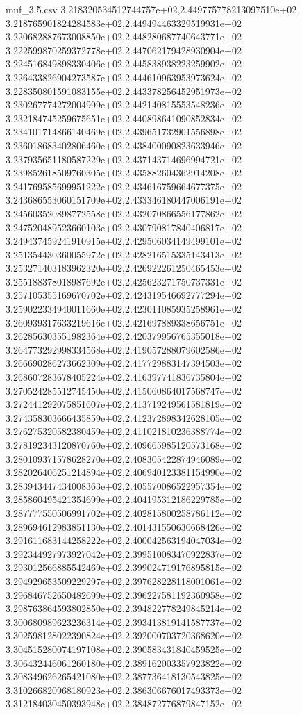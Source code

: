 \begin{filecontents*}{muf_3.5.csv}
3.218320534512744757e+02,2.449775778213097510e+02
3.218765901824284583e+02,2.449494463329519931e+02
3.220682887673008850e+02,2.448280687740643771e+02
3.222599870259372778e+02,2.447062179428930904e+02
3.224516849898330406e+02,2.445838938223259902e+02
3.226433826904273587e+02,2.444610963953973624e+02
3.228350801591083155e+02,2.443378256452951973e+02
3.230267774272004999e+02,2.442140815553548236e+02
3.232184745259675651e+02,2.440898641090852834e+02
3.234101714866140469e+02,2.439651732901556898e+02
3.236018683402806460e+02,2.438400090823633946e+02
3.237935651180587229e+02,2.437143714696994721e+02
3.239852618509760305e+02,2.435882604362914208e+02
3.241769585699951222e+02,2.434616759664677375e+02
3.243686553060151709e+02,2.433346180447006191e+02
3.245603520898772558e+02,2.432070866556177862e+02
3.247520489523660103e+02,2.430790817840406817e+02
3.249437459241910915e+02,2.429506034149499101e+02
3.251354430360055972e+02,2.428216515335143413e+02
3.253271403183962320e+02,2.426922261250465453e+02
3.255188378018987692e+02,2.425623271750737331e+02
3.257105355169670702e+02,2.424319546692777294e+02
3.259022334940011660e+02,2.423011085935258961e+02
3.260939317633219616e+02,2.421697889338656751e+02
3.262856303551982364e+02,2.420379956765355018e+02
3.264773292998334568e+02,2.419057288079602586e+02
3.266690286273662309e+02,2.417729883147394503e+02
3.268607283678405224e+02,2.416397741836735804e+02
3.270524285512745450e+02,2.415060864017568747e+02
3.272441292075851607e+02,2.413719249561581819e+02
3.274358303666435859e+02,2.412372898342628105e+02
3.276275320582380459e+02,2.411021810236388774e+02
3.278192343120870760e+02,2.409665985120573168e+02
3.280109371578628270e+02,2.408305422874946089e+02
3.282026406251214894e+02,2.406940123381154990e+02
3.283943447434008363e+02,2.405570086522957354e+02
3.285860495421354699e+02,2.404195312186229785e+02
3.287777550506991702e+02,2.402815800258786112e+02
3.289694612983851130e+02,2.401431550630668426e+02
3.291611683144258222e+02,2.400042563194047034e+02
3.292344927973927042e+02,2.399510083470922837e+02
3.293012566885542469e+02,2.399024719176895815e+02
3.294929653509229297e+02,2.397628228118001061e+02
3.296846752650482699e+02,2.396227581192360958e+02
3.298763864593802850e+02,2.394822778249845214e+02
3.300680989623236314e+02,2.393413819141587737e+02
3.302598128022390824e+02,2.392000703720368620e+02
3.304515280074197108e+02,2.390583431840459525e+02
3.306432446061260180e+02,2.389162003357923822e+02
3.308349626265421080e+02,2.387736418130543825e+02
3.310266820968180923e+02,2.386306676017493373e+02
3.312184030450393948e+02,2.384872776879847152e+02

\end{filecontents*}
